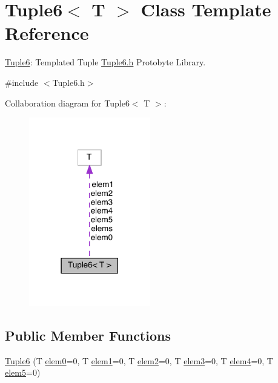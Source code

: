 \hypertarget{class_tuple6}{\section{Tuple6$<$ T $>$ Class Template Reference}
\label{class_tuple6}
}


\hyperlink{class_tuple6}{Tuple6}\-: Templated Tuple \hyperlink{_tuple6_8h}{Tuple6.\-h} Protobyte Library.  




{\ttfamily \#include $<$Tuple6.\-h$>$}



Collaboration diagram for Tuple6$<$ T $>$\-:
\nopagebreak
\begin{figure}[H]
\begin{center}
\leavevmode
\includegraphics[width=150pt]{class_tuple6__coll__graph}
\end{center}
\end{figure}
\subsection*{Public Member Functions}
\begin{DoxyCompactItemize}
\item 
\hyperlink{class_tuple6_abc01f7d4027f9c4d1ac862a8bb964dd3}{Tuple6} (T \hyperlink{class_tuple6_a97d05a1b12d13108263a7d4d525005fc}{elem0}=0, T \hyperlink{class_tuple6_a945417738c4f920052c3bca9708228ad}{elem1}=0, T \hyperlink{class_tuple6_a34e39006de023478d27f0ba9a701926a}{elem2}=0, T \hyperlink{class_tuple6_ac032ddcdf705f7f06f920fbf0687aca2}{elem3}=0, T \hyperlink{class_tuple6_aa2cd703b550694d8145b7d6d4db6b78a}{elem4}=0, T \hyperlink{class_tuple6_a6c405e93796d0a78f00def3c528036b0}{elem5}=0)
\end{DoxyCompactItemize}
